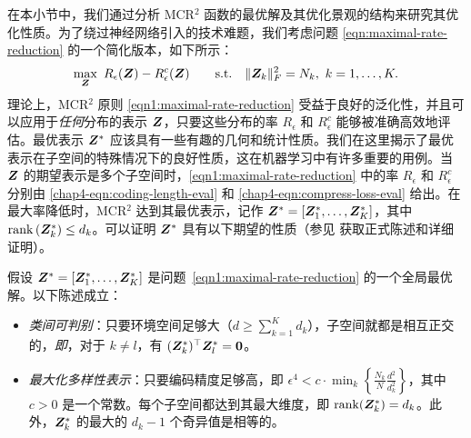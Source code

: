 \documentclass[../../book-main_zh.tex]{subfiles}
\begin{document}
在本小节中，我们通过分析 MCR$^2$ 函数的最优解及其优化景观的结构来研究其优化性质。为了绕过神经网络引入的技术难题，我们考虑问题 \eqref{eqn:maximal-rate-reduction} 的一个简化版本，如下所示：
\begin{align}\label{eqn1:maximal-rate-reduction}
    \max_{\bm Z}\ R_{\epsilon}(\bm{Z}) - R_{\epsilon}^c(\bm{Z})\qquad \mathrm{s.t.}\quad \|\bm Z_k\|_F^2 = N_k,\ k =1,\dots,K. 
\end{align}
理论上，MCR$^2$ 原则 \eqref{eqn1:maximal-rate-reduction} 受益于良好的泛化性，并且可以应用于{\em 任何}分布的表示 $\bm{Z}$，只要这些分布的率 $R_\epsilon$ 和 $R^c_\epsilon$ 能够被准确高效地评估。最优表示 $\bm{Z}^{\ast}$ 应该具有一些有趣的几何和统计性质。我们在这里揭示了最优表示在子空间的特殊情况下的良好性质，这在机器学习中有许多重要的用例。当 $\bm{Z}$ 的期望表示是多个子空间时，\eqref{eqn1:maximal-rate-reduction} 中的率 $R_\epsilon$ 和 $R^c_\epsilon$ 分别由 \eqref{chap4-eqn:coding-length-eval} 和 \eqref{chap4-eqn:compress-loss-eval} 给出。在最大率降低时，MCR$^2$ 达到其最优表示，记作 $\bm{Z}^{\ast} = [\bm{Z}_1^*,\dots,\bm{Z}_K^*]$，其中 $\operatorname{rank}{(\bm{Z}_{k}^*)}\le d_k$。可以证明 $\bm{Z}^{\ast}$ 具有以下期望的性质（参见 \cite{yu2020learning} 获取正式陈述和详细证明）。

\begin{theorem}[\bf 全局最优解的刻画]
	假设 $\bm{Z}^{\ast} = [\bm{Z}_1^*,\dots,\bm{Z}_K^*]$ 是问题~\eqref{eqn1:maximal-rate-reduction} 的一个全局最优解。以下陈述成立：
	\begin{itemize}
		\item {\em 类间可判别}：只要环境空间足够大（$d \ge \sum_{k=1}^{K} d_k$），子空间就都是相互正交的，{\em 即}，对于 $k \not= l$，有 $(\bm{Z}_{k}^*)^{\top} \bm{Z}_{l}^* = \bm{0}$。
		\item {\em 最大化多样性表示}：只要编码精度足够高，即 $\epsilon ^4 < c\cdot \min_{k}\left\{ \frac{N_k}{N}\frac{d^2}{d_k^2}\right\}$，其中 $c>0$ 是一个常数。每个子空间都达到其最大维度，即 $\mathrm{rank}{(\bm{Z}_{k}^*)}= d_k$。此外，$\bm{Z}_{k}^*$ 的最大的 $d_k-1$ 个奇异值是相等的。
		      \label{thm:MCR2-properties}
	\end{itemize}
\end{theorem}

\end{document}
